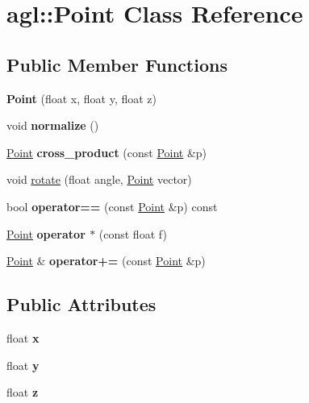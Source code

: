 \hypertarget{classagl_1_1Point}{}\section{agl\+::Point Class Reference}
\label{classagl_1_1Point}
\subsection*{Public Member Functions}
\begin{DoxyCompactItemize}
\item 
\mbox{\label{classagl_1_1Point_a5635164befc9b7aa82d4b9c2d73171d1}} 
{\bfseries Point} (float x, float y, float z)
\item 
\mbox{\label{classagl_1_1Point_a1b476e0f27e55c86bc7ab4e4357d1fc0}} 
void {\bfseries normalize} ()
\item 
\mbox{\label{classagl_1_1Point_a7224d94cc5dae3c9cb264c9347243746}} 
\mbox{\hyperlink{classagl_1_1Point}{Point}} {\bfseries cross\+\_\+product} (const \mbox{\hyperlink{classagl_1_1Point}{Point}} \&p)
\item 
void \mbox{\hyperlink{classagl_1_1Point_a2fd5848bb72d952cd6e73b0255a5ebb2}{rotate}} (float angle, \mbox{\hyperlink{classagl_1_1Point}{Point}} vector)
\item 
\mbox{\label{classagl_1_1Point_ad2f5b77b334ee406033297630c4b4ee4}} 
bool {\bfseries operator==} (const \mbox{\hyperlink{classagl_1_1Point}{Point}} \&p) const
\item 
\mbox{\label{classagl_1_1Point_a4b8043be7d8dacbabd90f1f5799a6cbc}} 
\mbox{\hyperlink{classagl_1_1Point}{Point}} {\bfseries operator $\ast$} (const float f)
\item 
\mbox{\label{classagl_1_1Point_a70f39381e9c29cd954f2f646ab1c2074}} 
\mbox{\hyperlink{classagl_1_1Point}{Point}} \& {\bfseries operator+=} (const \mbox{\hyperlink{classagl_1_1Point}{Point}} \&p)
\end{DoxyCompactItemize}
\subsection*{Public Attributes}
\begin{DoxyCompactItemize}
\item 
\mbox{\label{classagl_1_1Point_a51670f86adbcebc56f3bed24e299f90a}} 
float {\bfseries x}
\item 
\mbox{\label{classagl_1_1Point_a300951e708e9f807a0a65d16e39bbf26}} 
float {\bfseries y}
\item 
\mbox{\label{classagl_1_1Point_a33490094077b57b79b30532d3e714aef}} 
float {\bfseries z}
\end{DoxyCompactItemize}


